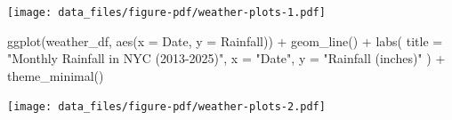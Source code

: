 \documentclass[
  letterpaper,
  DIV=11,
  numbers=noendperiod]{scrreprt}
\newenvironment{Shaded}{\begin{snugshade}}{\end{snugshade}}
\newcommand{\AttributeTok}[1]{\textcolor[rgb]{0.40,0.45,0.13}{#1}}
\newcommand{\FunctionTok}[1]{\textcolor[rgb]{0.28,0.35,0.67}{#1}}
\newcommand{\NormalTok}[1]{\textcolor[rgb]{0.00,0.23,0.31}{#1}}
\newcommand{\SpecialCharTok}[1]{\textcolor[rgb]{0.37,0.37,0.37}{#1}}
\newcommand{\StringTok}[1]{\textcolor[rgb]{0.13,0.47,0.30}{#1}}
\begin{document}
\texttt{[image: data\_files/figure-pdf/weather-plots-1.pdf]}

\begin{Shaded}
\begin{Highlighting}[]
\FunctionTok{ggplot}\NormalTok{(weather\_df, }\FunctionTok{aes}\NormalTok{(}\AttributeTok{x =}\NormalTok{ Date, }\AttributeTok{y =}\NormalTok{ Rainfall)) }\SpecialCharTok{+}
  \FunctionTok{geom\_line}\NormalTok{() }\SpecialCharTok{+}
  \FunctionTok{labs}\NormalTok{(}
    \AttributeTok{title =} \StringTok{"Monthly Rainfall in NYC (2013{-}2025)"}\NormalTok{,}
    \AttributeTok{x =} \StringTok{"Date"}\NormalTok{,}
    \AttributeTok{y =} \StringTok{"Rainfall (inches)"}
\NormalTok{  ) }\SpecialCharTok{+}
  \FunctionTok{theme\_minimal}\NormalTok{()}
\end{Highlighting}
\end{Shaded}

\texttt{[image: data\_files/figure-pdf/weather-plots-2.pdf]}
\end{document}
